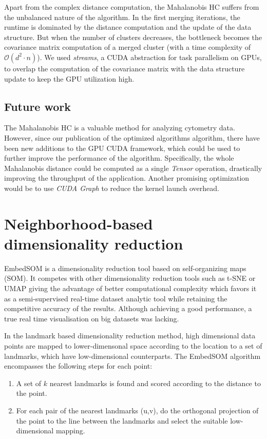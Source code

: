 Apart from the complex distance computation, the Mahalanobis HC suffers from the unbalanced nature of the algorithm. In the first merging iterations, the runtime is dominated by the distance computation and the update of the data structure. But when the number of clusters decreases, the bottleneck becomes the covariance matrix computation of a merged cluster (with a time complexity of $\mathcal{O}(d^2 \cdot n)$). We used \emph{streams}, a CUDA abstraction for task parallelism on GPUs, to overlap the computation of the covariance matrix with the data structure update to keep the GPU utilization high.

\subsection{Future work}

The Mahalanobis HC is a valuable method for analyzing cytometry data. However, since our publication of the optimized algorithms algorithm, there have been new additions to the GPU CUDA framework, which could be used to further improve the performance of the algorithm. Specifically, the whole Mahalanobis distance could be computed as a single \emph{Tensor} operation, drastically improving the throughput of the application. Another promising optimization would be to use \emph{CUDA Graph} to reduce the kernel launch overhead.


\section{Neighborhood-based dimensionality reduction}

EmbedSOM is a dimensionality reduction tool based on self-organizing maps (SOM). It competes with other dimensionality reduction tools such as t-SNE or UMAP giving the advantage of better computational complexity which favors it as a semi-supervised real-time dataset analytic tool while retaining the competitive accuracy of the results.
Although achieving a good performance, a true real time visualisation on big datasets was lacking. 

In the landmark based dimensionality reduction method, high dimensional data points are mapped to lower-dimensonal space according to the location to a set of landmarks, which have low-dimensional counterparts.
The EmbedSOM algorithm encompasses the following steps for each point:
\begin{enumerate}
    \item A set of $k$ nearest landmarks is found and scored according to the distance to the point.
    \item For each pair of the nearest landmarks (u,v), do the orthogonal projection of the point to the line between the landmarks and select the suitable low-dimensional mapping.
\end{enumerate}

